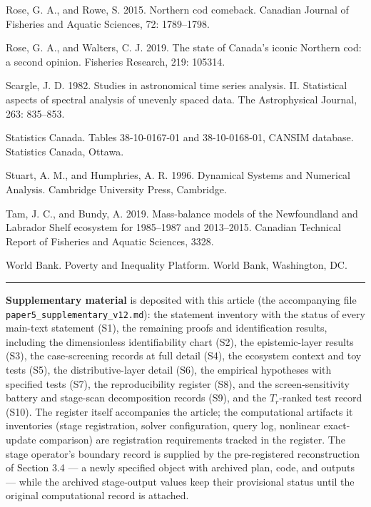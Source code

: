 \documentclass[11pt]{article}
\begin{document}
Rose, G. A., and Rowe, S. 2015. Northern cod comeback. Canadian Journal
of Fisheries and Aquatic Sciences, 72: 1789--1798.

Rose, G. A., and Walters, C. J. 2019. The state of Canada's iconic
Northern cod: a second opinion. Fisheries Research, 219: 105314.

Scargle, J. D. 1982. Studies in astronomical time series analysis. II.
Statistical aspects of spectral analysis of unevenly spaced data. The
Astrophysical Journal, 263: 835--853.

Statistics Canada. Tables 38-10-0167-01 and 38-10-0168-01, CANSIM
database. Statistics Canada, Ottawa.

Stuart, A. M., and Humphries, A. R. 1996. Dynamical Systems and
Numerical Analysis. Cambridge University Press, Cambridge.

Tam, J. C., and Bundy, A. 2019. Mass-balance models of the Newfoundland
and Labrador Shelf ecosystem for 1985--1987 and 2013--2015. Canadian
Technical Report of Fisheries and Aquatic Sciences, 3328.

World Bank. Poverty and Inequality Platform. World Bank, Washington, DC.

\begin{center}\rule{0.5\linewidth}{0.5pt}\end{center}

\textbf{Supplementary material} is deposited with this article (the
accompanying file \texttt{paper5\_supplementary\_v12.md}): the statement
inventory with the status of every main-text statement (S1), the
remaining proofs and identification results, including the dimensionless
identifiability chart (S2), the epistemic-layer results (S3), the
case-screening records at full detail (S4), the ecosystem context and
toy tests (S5), the distributive-layer detail (S6), the empirical
hypotheses with specified tests (S7), the reproducibility register
(S8), and the screen-sensitivity battery and stage-scan decomposition
records (S9), and the \(T_r\)-ranked test record (S10). The register itself accompanies the article; the computational
artifacts it inventories (stage registration, solver configuration,
query log, nonlinear exact-update comparison) are registration
requirements tracked in the register. The stage operator's boundary
record is supplied by the pre-registered reconstruction of
Section 3.4 --- a newly specified object with archived plan, code, and
outputs --- while the archived stage-output values keep their
provisional status until the original computational record is attached.
\end{document}
